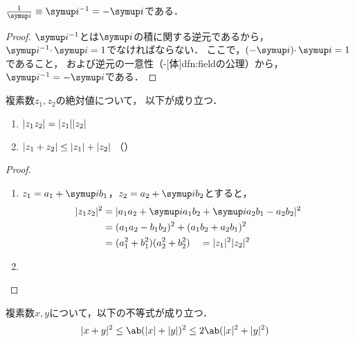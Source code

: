 \documentclass[../sotsu.tex]{subfiles}
\begin{document}
\begin{proposition}
    $\frac{1}{\iu} \equiv \iu^{-1} = -\iu$である．
\end{proposition}

\begin{proof}
    $\iu^{-1}$とは$\iu$の積に関する逆元であるから，
    $\iu^{-1} \cdotp \iu = 1$でなければならない．
    ここで，$(-\iu) \cdotp \iu = 1$であること，
    および逆元の一意性（-[体]{dfn:field}の公理）から，$\iu^{-1} = -\iu$である．
\end{proof}

\begin{proposition}
    複素数$z_1, z_2$の絶対値について，
    以下が成り立つ．
    \begin{enumerate}
        \item $\lvert z_1 z_2\rvert = \lvert z_1\rvert \lvert z_2\rvert$
        \item $\lvert z_1 + z_2\rvert \leq \lvert z_1\rvert + \lvert z_2\rvert$
            （）
    \end{enumerate}
\end{proposition}

\begin{proof}
    \begin{enumerate}
        \item $z_1 = a_1 + \iu b_1$，$z_2 = a_2 + \iu b_2$とすると，
            \begin{equation*}
                \begin{split}
                    \abs{z_1 z_2}^2 
                        &= \abs{ a_1 a_2 + \iu a_1 b_2 + \iu a_2 b_1 - a_2 b_2 }^2   \\
                        &= (a_1 a_2 - b_1 b_2)^2 + (a_1 b_2 + a_2 b_1)^2   \\
                        &= (a_1^2 + b_1^2) (a_2^2 + b_2^2)
                        \quad = \abs{z_1}^2 \abs{z_2}^2
                \end{split}
            \end{equation*}
        \item 
    \end{enumerate}
\end{proof}


\begin{proposition}
    \label{thm:complex-abs-squared-inequality}
    複素数$x, y$について，以下の不等式が成り立つ．
    \begin{align}
        \label{eq:complex-abs-squared-inequality}
        \abs{x + y}^2 
            &\leq \ab( \abs{x} + \abs{y} )^2 
            \leq 2\ab( \abs{x}^2 + \abs{y}^2 )
    \end{align}
\end{proposition}
\end{document}
